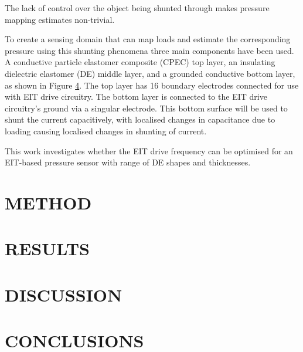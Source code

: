 The lack of control over the object being shunted through makes pressure mapping estimates non-trivial.

To create a sensing domain that can map loads and estimate the corresponding pressure using this shunting phenomena three main components have been used. A conductive particle elastomer composite (CPEC) top layer, an insulating dielectric elastomer (DE) middle layer, and a grounded conductive bottom layer, as shown in Figure \ref{}. The top layer has 16 boundary electrodes connected for use with EIT drive circuitry. The bottom layer is connected to the EIT drive circuitry's ground via a singular electrode. This bottom surface will be used to shunt the current capacitively, with localised changes in capacitance due to loading causing localised changes in shunting of current.


This work investigates whether the EIT drive frequency can be optimised for an EIT-based pressure sensor with range of DE shapes and thicknesses.


\section{METHOD}




\section{RESULTS}




\section{DISCUSSION}




\section{CONCLUSIONS}

\afterpage{\blankpage}